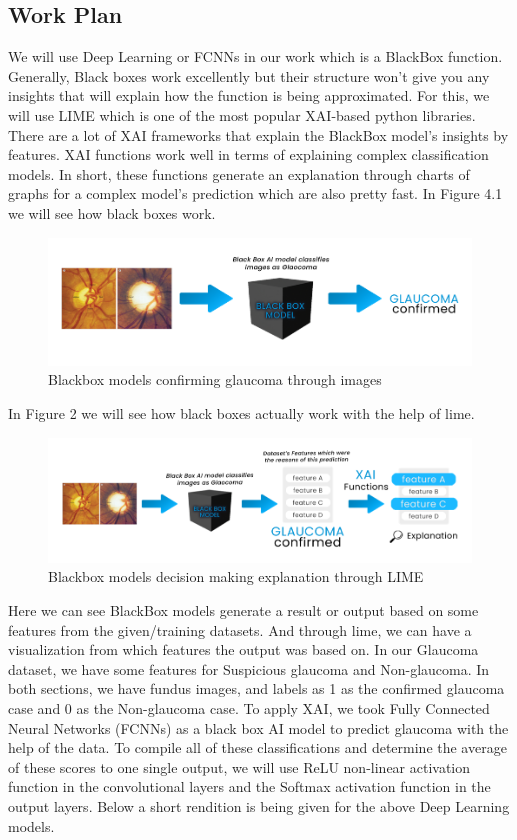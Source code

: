 \documentclass[conference]{IEEEtran}
\begin{document}
\subsection{Work Plan}
We will use Deep Learning or FCNNs in our work which is a BlackBox function. Generally, Black boxes work excellently but their structure won’t give you any insights that will explain how the function is being approximated. For this, we will use LIME which is one of the most popular XAI-based python libraries. There are a lot of XAI frameworks that explain the BlackBox model’s insights by features. XAI functions work well in terms of explaining complex classification models. In short, these functions generate an explanation through charts of graphs for a complex model's prediction which are also pretty fast. In Figure 4.1 we will see how black boxes work.

\begin{figure}[hbt!]
\centerline{\includegraphics[scale=0.5]{fig-1.png}}
\caption{Blackbox models confirming glaucoma through images}
\label{fig}
\end{figure}

\noindent In Figure 2 we will see how black boxes actually work with the help of lime.

\begin{figure}[htbp]
\centerline{\includegraphics[scale=0.5]{fig-2.png}}
\caption{Blackbox models decision making explanation through LIME}
\label{fig}
\end{figure}

\noindent Here we can see BlackBox models generate a result or output based on some features from the given/training datasets. And through lime, we can have a visualization from which features the output was based on.
In our Glaucoma dataset, we have some features for Suspicious glaucoma and Non-glaucoma. In both sections, we have fundus images, and labels as 1 as the confirmed glaucoma case and 0 as the Non-glaucoma case. To apply XAI, we took Fully Connected Neural Networks (FCNNs) as a black box AI model to predict glaucoma with the help of the data. To compile all of these classifications and determine the average of these scores to one single output, we will use ReLU non-linear activation function in the convolutional layers and the Softmax activation function in the output layers. Below a short rendition is being given for the above Deep Learning models.
\end{document}
